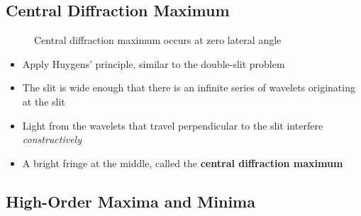 \subsection{Central Diffraction Maximum}
\begin{figure}[ht]
  \centering
  \caption{Central diffraction maximum occurs at zero lateral angle}
  \label{fig:central-max}
\end{figure}
\begin{itemize}
\item Apply Huygens' principle, similar to the double-slit problem
\item The slit is wide enough that there is an infinite series
  of wavelets originating at the slit
\item Light from the wavelets that travel perpendicular to the slit
  interfere \emph{constructively}
\item A bright fringe at the middle, called the
  \textbf{central diffraction maximum}
\end{itemize}




\subsection{High-Order Maxima and Minima}

